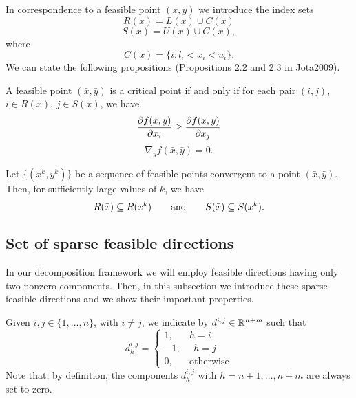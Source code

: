 In correspondence to a feasible point $(x,y)$ we introduce the index sets
$$
R(x)=L(x)\cup C(x)
$$
$$
S(x)=U(x)\cup C(x),
$$
where 
$$
C(x)=\{i: l_i<x_i<u_i\}.
$$
We can state the following propositions (Propositions 2.2 and 2.3 in Jota2009).
\begin{proposition}\label{2.2}
 A feasible point $(\bar x,\bar y)$ is a critical point if and only if for each pair $(i,j)$,
$i\in R(\bar x)$, $j\in S(\bar x)$, we have
\begin{equation}\label{on_RS}
 {{\partial f(\bar x,\bar y)}\over{\partial x_i}}\ge
 {{\partial f(\bar x,\bar y)}\over{\partial x_j}}
\end{equation}
\begin{equation}\label{on_y2}
\nabla_yf(\bar x,\bar y)=0.
\end{equation}
\end{proposition}
\begin{proposition}\label{2.3}
 Let $\{(x^k,y^k)\}$ be a sequence of feasible points convergent to a point $(\bar x,\bar y)$.
Then, for sufficiently large values of $k$, we have
$$
R(\bar x)\subseteq R(x^k) \quad \quad {\rm and}\quad \quad S(\bar x)\subseteq S(x^k).
$$
\end{proposition}

\subsection{Set of sparse feasible directions}
In our decomposition framework we will employ feasible directions having only two
nonzero components.
Then, in this subsection we introduce these sparse feasible directions and we show their important properties.

Given $i, j\in  \{1, \ldots ,n\}$, with $i\ne j$,
we indicate by $d^{i,j}\in  \mathbb{R}^{n+m}$ such that
\begin{equation}\label{eq:direction}
d_h^{i,j}= 
\begin{cases}
1, \quad \text{    } h=i\\
-1, \text{    } \text{    } h=j\\
0, \quad \text{    } \text{otherwise}
\end{cases}
\end{equation}
Note that, by definition, the components $d_h^{i,j}$ with $h=n+1,\ldots,n+m$ are always set to zero.

